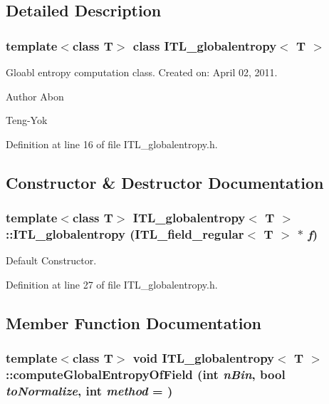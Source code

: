 \subsection{Detailed Description}
\subsubsection*{template$<$class T$>$ class ITL\_\-globalentropy$<$ T $>$}

Gloabl entropy computation class. Created on: April 02, 2011. \begin{DoxyAuthor}{Author}
Abon 

Teng-\/Yok 
\end{DoxyAuthor}


Definition at line 16 of file ITL\_\-globalentropy.h.



\subsection{Constructor \& Destructor Documentation}
\hypertarget{classITL__globalentropy_af82eb0ffa8d7d33ec3e3c6af95322cf2}{
\subsubsection[{ITL\_\-globalentropy}]{\setlength{\rightskip}{0pt plus 5cm}template$<$class T$>$ {\bf ITL\_\-globalentropy}$<$ T $>$::{\bf ITL\_\-globalentropy} ({\bf ITL\_\-field\_\-regular}$<$ T $>$ $\ast$ {\em f})}}
\label{classITL__globalentropy_af82eb0ffa8d7d33ec3e3c6af95322cf2}


Default Constructor. 



Definition at line 27 of file ITL\_\-globalentropy.h.



\subsection{Member Function Documentation}
\hypertarget{classITL__globalentropy_ad6e98f40d85501050f6a055bd8218525}{
\subsubsection[{computeGlobalEntropyOfField}]{\setlength{\rightskip}{0pt plus 5cm}template$<$class T$>$ void {\bf ITL\_\-globalentropy}$<$ T $>$::computeGlobalEntropyOfField (int {\em nBin}, \/  bool {\em toNormalize}, \/  int {\em method} = {})}}
\label{classITL__globalentropy_ad6e98f40d85501050f6a055bd8218525}


